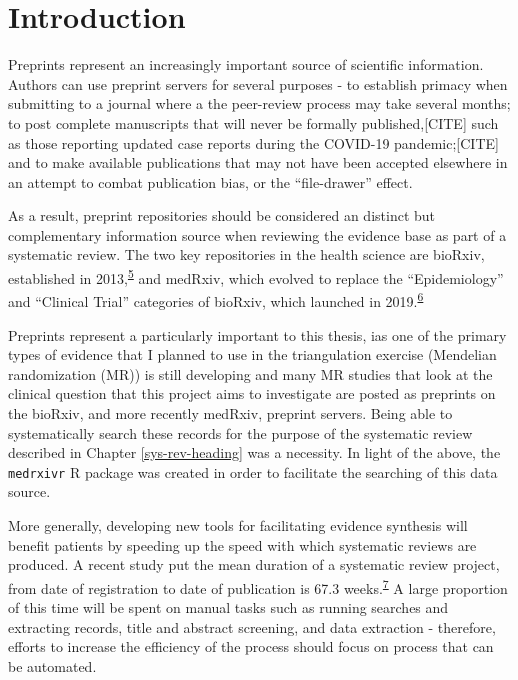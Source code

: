 \documentclass[a4paper, twoside]{templates/ociamthesis}
\begin{document}
\hypertarget{introduction}{%
\section{Introduction}\label{introduction}}

Preprints represent an increasingly important source of scientific information. Authors can use preprint servers for several purposes - to establish primacy when submitting to a journal where a the peer-review process may take several months; to post complete manuscripts that will never be formally published,{[}CITE{]} such as those reporting updated case reports during the COVID-19 pandemic;{[}CITE{]} and to make available publications that may not have been accepted elsewhere in an attempt to combat publication bias, or the ``file-drawer'' effect.

As a result, preprint repositories should be considered an distinct but complementary information source when reviewing the evidence base as part of a systematic review. The two key repositories in the health science are bioRxiv, established in 2013,\textsuperscript{\protect\hyperlink{ref-sever2019}{5}} and medRxiv, which evolved to replace the ``Epidemiology'' and ``Clinical Trial'' categories of bioRxiv, which launched in 2019.\textsuperscript{\protect\hyperlink{ref-rawlinson2019}{6}}

Preprints represent a particularly important to this thesis, ias one of the primary types of evidence that I planned to use in the triangulation exercise (Mendelian randomization (MR)) is still developing and many MR studies that look at the clinical question that this project aims to investigate are posted as preprints on the bioRxiv, and more recently medRxiv, preprint servers. Being able to systematically search these records for the purpose of the systematic review described in Chapter \ref{sys-rev-heading} was a necessity. In light of the above, the \texttt{medrxivr} R package was created in order to facilitate the searching of this data source.

More generally, developing new tools for facilitating evidence synthesis will benefit patients by speeding up the speed with which systematic reviews are produced. A recent study put the mean duration of a systematic review project, from date of registration to date of publication is 67.3 weeks.\textsuperscript{\protect\hyperlink{ref-borah2017}{7}} A large proportion of this time will be spent on manual tasks such as running searches and extracting records, title and abstract screening, and data extraction - therefore, efforts to increase the efficiency of the process should focus on process that can be automated.
\end{document}
